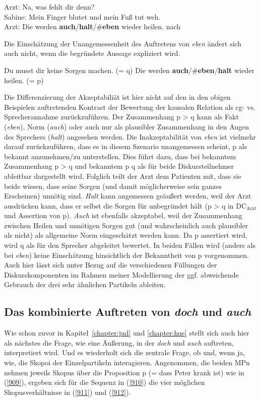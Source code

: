 {\noindent\parbox{\textwidth}{\begin{exe}
	\ex\label{907}
	Arzt: Na, was fehlt dir denn?\\
	Sabine: Mein Finger blutet und mein Fuß tut weh.\\
	Arzt: Die werden \textbf{auch}/\textbf{halt}/\#\textbf{eben} wieder heilen.	
	\hfill\hbox{nach \citet[118]{Bublitz1978}}
\end{exe}}
Die Einschätzung der Unangemessenheit des Auftretens von \textit{eben} ändert sich auch nicht, wenn die begründete Aussage expliziert wird.

\begin{exe}
	\ex\label{908}
	Du musst dir keine Sorgen machen. (= q) Die werden \textbf{auch}/\#\textbf{eben}/\textbf{halt} wieder heilen. (= p)
\end{exe}	
Die Differenzierung der Akzeptabiliät ist hier nicht auf den in den obigen Beispielen auftretenden Kontrast der Bewertung der kausalen Relation als cg- vs. Sprecherannahme zurückzuführen. Der Zusammenhang p > q kann als Fakt (\textit{eben}), Norm (\textit{auch}) oder auch nur als plausibler Zusammenhang in den Augen des Sprechers (\textit{halt}) angesehen werden. Die Inakzeptabilität von \textit{eben} ist vielmehr darauf zurückzuführen, dass es in diesem Szenario unangemessen scheint, p als bekannt anzunehmen/zu unterstellen. Dies führt dazu, dass bei bekanntem Zusammenhang p > q und bekanntem p q als für beide Diskursteilnehmer ableitbar dargestellt wird. Folglich teilt der Arzt dem Patienten mit, dass sie beide wissen, dass seine Sorgen (und damit möglicherweise sein ganzes Erscheinen) unnötig sind. \textit{Halt} kann angemessen geäußert werden, weil der Arzt ausdrücken kann, dass er selbst die Sorgen für unbegründet hält (p > q in DC$_{\textrm{Arzt}}$ und Assertion von p). \textit{Auch} ist ebenfalls akzeptabel, weil der Zusammenhang zwischen Heilen und unnötigen Sorgen gut (und wahrscheinlich auch plausibler als nicht) als allgemeine Norm eingeschätzt werden kann. Da p assertiert wird, wird q als für den Sprecher abgeleitet bewertet. In beiden Fällen wird (anders als bei \textit{eben}) keine Einschätzung hinsichtlich der Bekanntheit von p vorgenommen. Auch hier lässt sich unter Bezug auf die verschiedenen Füllungen der Diskurskomponenten im Rahmen meiner Modellierung der ggf. abweichende Gebrauch der drei sehr ähnlichen Partikeln ableiten.

\subsection{Das kombinierte Auftreten von \textit{doch} und \textit{auch}}
Wie schon zuvor in Kapitel~\ref{chapter:jud} und \ref{chapter:hue} stellt sich auch hier als nächstes die Frage, wie eine Äußerung, in der \textit{doch} und \textit{auch} auftreten, interpretiert wird. Und es wiederholt sich die zentrale Frage, ob und, wenn ja, wie, die Skopoi  der Einzelpartikeln interagieren. Angenommen, die beiden MPn nehmen jeweils Skopus über die Proposition p (= dass Peter krank ist) wie in (\ref{909}), ergeben sich für die Sequenz in (\ref{910}) die vier möglichen Skopusverhältnisse in (\ref{911}) und (\ref{912}).

}
